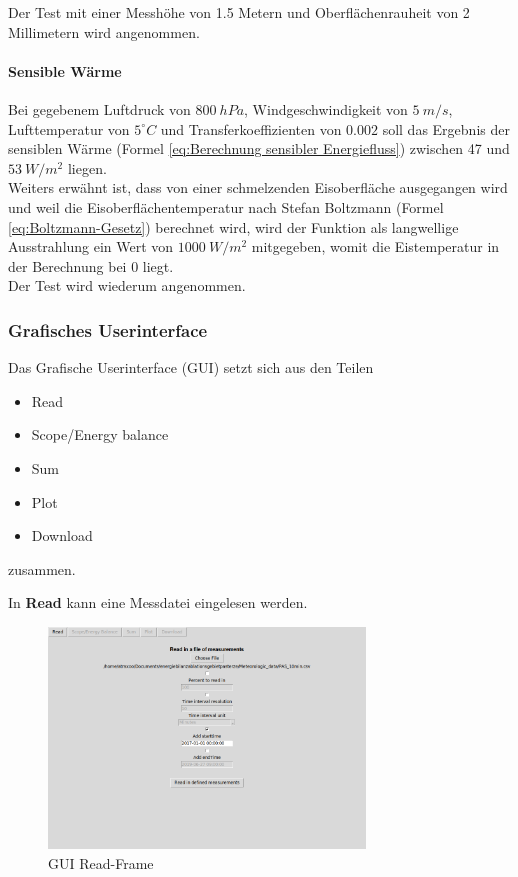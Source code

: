 \documentclass[12pt,a4paper]{article}
\newcommand{\guiplotsize}{0.75}
\begin{document}
Der Test mit einer Messhöhe von 1.5 Metern und Oberflächenrauheit von 2 Millimetern wird angenommen.

\paragraph{Sensible Wärme}
Bei gegebenem Luftdruck von $800~hPa$, Windgeschwindigkeit von $5~m/s$, Lufttemperatur von $5^\circ C$ und Transferkoeffizienten von $0.002$ soll das Ergebnis der sensiblen Wärme (Formel \ref{eq:Berechnung sensibler Energiefluss}) zwischen 47 und $53~W/m^2$ liegen. \\
Weiters erwähnt ist, dass von einer schmelzenden Eisoberfläche ausgegangen wird und weil die Eisoberflächentemperatur nach Stefan Boltzmann (Formel \ref{eq:Boltzmann-Gesetz}) berechnet wird, wird der Funktion als langwellige Ausstrahlung ein Wert von $1000~W/m^2$ mitgegeben, womit die Eistemperatur in der Berechnung bei 0 liegt.\\

Der Test wird wiederum angenommen.

\subsubsection{Grafisches Userinterface}
Das Grafische Userinterface (GUI) setzt sich aus den Teilen 
\begin{itemize}
\item Read
\item Scope/Energy balance
\item Sum
\item Plot
\item Download
\end{itemize}
zusammen.

In \textbf{Read} kann eine Messdatei eingelesen werden. 

\begin{figure}[H]
\centering
\includegraphics[width=\guiplotsize\textwidth]{pictures/GUI/Read_Frame.png}
\caption{GUI Read-Frame}
\label{fig:GUI Read-Frame}
\end{figure}
\end{document}
